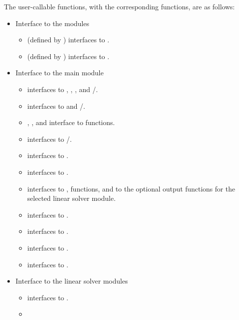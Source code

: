 The user-callable functions, with the corresponding {\ida} functions,
are as follows:
\begin{itemize}
\item
  Interface to the {\nvector} modules
  \begin{itemize}
  \item {} (defined by {\nvecs}) 
    interfaces to .
  \item {} (defined by {\nvecp}) 
    interfaces to .
  \end{itemize}
\item Interface to the main {\ida} module
  \begin{itemize}
  \item {}
    interfaces to , , , and /.
  \item {}
    interfaces to  and /.
  \item {}, , and 
    interface to  functions.    
  \item {}
    interfaces to /.
  \item {}
    interfaces to .
  \item {}
    interfaces to .
  \item {}
    interfaces to ,  functions, and to the optional
    output functions for the selected linear solver module.
  \item {}
    interfaces to .
  \item {}
    interfaces to .
  \item {}
    interfaces to .
  \item {}    
    interfaces to .
  \end{itemize}
\item Interface to the linear solver modules
  \begin{itemize}
  \item {}
    interfaces to .
  \item {}

\end{itemize}
\end{itemize}
